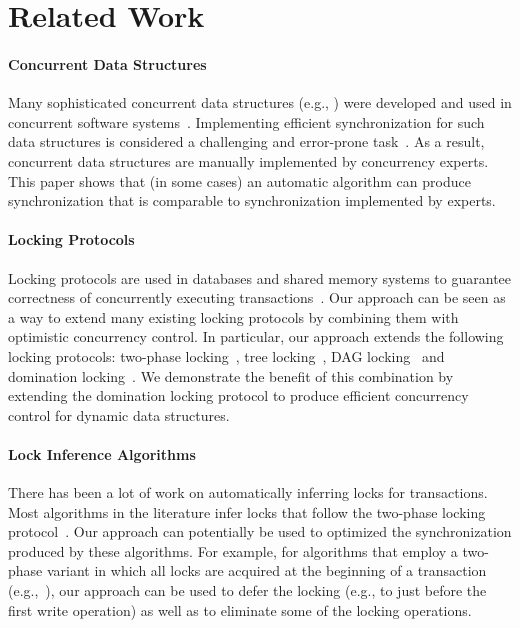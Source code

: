 \section{Related Work}\label{sec:related}
\paragraph{Concurrent Data Structures}
Many sophisticated concurrent data structures (e.g., \cite{ArbelA2014,DrachslerVY2014,NatarajanM2014,BrownER2014,CrainGR2013,BraginskyP2012,
AfekKKMT2012,EllenFRB2010,BronsonCCO2010,HerlihyLLS2007,Michael:1996})
were developed and used in concurrent software systems~\cite{Ohad:OOPSLA11}.
Implementing efficient synchronization for such data structures is considered a challenging and error-prone task~\cite{Ohad:OOPSLA11,Doh:SPAA04,Jin:2012}.
As a result, concurrent data structures are manually implemented by concurrency experts.
This paper shows that (in some cases) an automatic algorithm can produce synchronization that is comparable to synchronization implemented by experts.

\paragraph{Locking Protocols}
Locking protocols are used in databases and shared memory systems to guarantee correctness
of concurrently executing transactions~\cite{Weikum:2001,BHG:Book87}.
Our approach can be seen as a way to extend many existing locking protocols by combining them with  optimistic concurrency control.
In particular, our approach extends the following locking protocols:
two-phase locking~\cite{Eswaran:1976}, tree locking~\cite{SilberschatzK1980}, DAG locking~\cite{CH:PODS95} and domination locking~\cite{Gueta2011}.
We demonstrate the benefit of this combination by extending the  domination locking protocol to produce efficient concurrency control for
dynamic data structures.


\paragraph{Lock Inference Algorithms}
There has been a lot of work on automatically inferring locks for transactions.
Most   algorithms in the literature infer locks that follow the two-phase
locking protocol~\cite{MZGB:POPL06,Emmi06POPL,gudka2012lock,CCG:PLDI08,HFP:TRANSACT06,CGE:CC08}.
Our approach can potentially be used to optimized the synchronization produced by these algorithms.
For example, for  algorithms that employ a two-phase variant in which all locks are acquired at the beginning of a transaction (e.g.,~\cite{gudka2012lock,CCG:PLDI08}),
our approach can be used to defer the locking (e.g., to just before the first write operation) as well as to eliminate some of the locking operations.


